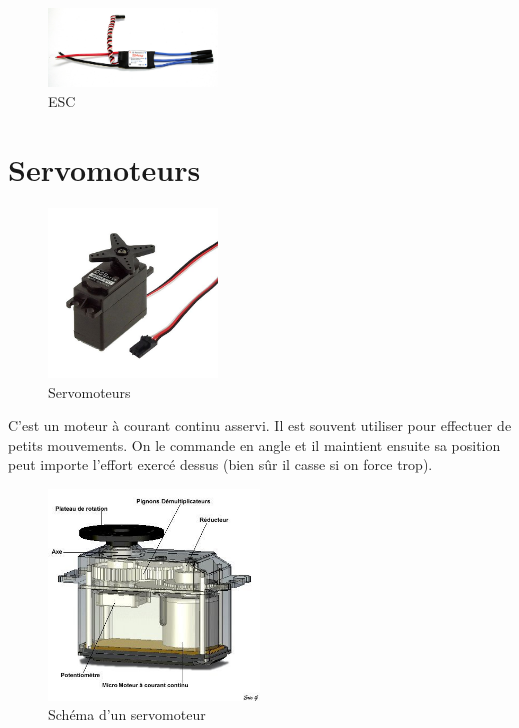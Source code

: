 \documentclass[a4paper, 11pt]{report}
\begin{document}
\begin{figure}[h!]
\begin{centering}
\includegraphics[width=0.4\textwidth]{images/ESC.jpg}
\caption{ESC}
\par\end{centering}
\end{figure}

\section{Servomoteurs}

\begin{figure}[h!]
\begin{centering}
\includegraphics[width=0.4\textwidth]{images/servomoteur.jpg}
\caption{Servomoteurs}
\par\end{centering}
\end{figure}

C'est un moteur à courant continu asservi. Il est souvent utiliser pour effectuer de petits mouvements. On le commande en angle et il maintient ensuite sa position peut importe l'effort exercé dessus (bien sûr il casse si on force trop).



\begin{figure}[h!]
\begin{centering}
\includegraphics[width=0.5\textwidth]{images/schemaServo.jpg}
\caption{Schéma d'un servomoteur}
\par\end{centering}
\end{figure}
\end{document}
